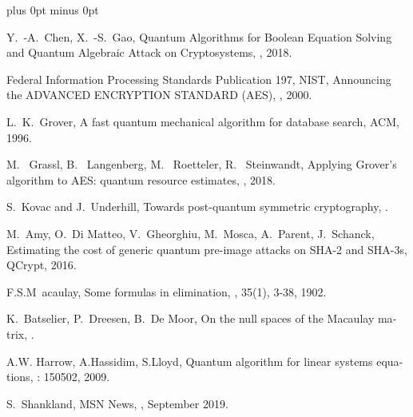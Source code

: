 \documentclass[a4paper,11pt]{article}
\begin{document}
\begin{otherlanguage}{english}

\begin{thebibliography}{1}
\itemsep=0cm plus 0pt minus 0pt

Y.~-A.~Chen, X.~-S.~Gao,
  \newblock Quantum Algorithms for Boolean Equation Solving and Quantum Algebraic Attack on Cryptosystems,
  , 2018.

Federal Information Processing Standards Publication 197, NIST,
  \newblock Announcing the ADVANCED ENCRYPTION STANDARD (AES),
  , 2000.

L.~K.~Grover,
  \newblock A fast quantum mechanical algorithm for database search, 
   ACM, 1996.

M.~ Grassl, B.~ Langenberg, M.~ Roetteler, R.~ Steinwandt,
  \newblock Applying Grover’s algorithm to AES: quantum resource estimates,
  , 2018.

S.~Kovac and J.~Underhill,
  \newblock Towards post-quantum symmetric cryptography,
  .

M.~Amy, O.~Di Matteo, V.~Gheorghiu, M.~Mosca, A.~Parent, J.~Schanck,
  \newblock Estimating the cost of generic quantum pre-image attacks on SHA-2 and SHA-3s, 
   QCrypt, 2016.

F.S.M~acaulay, 
  \newblock Some formulas in elimination, 
  , 35(1), 3-38, 1902. 

K.~Batselier, P.~Dreesen, B.~De Moor, 
  \newblock On the null spaces of the Macaulay matrix, 
  .  

A.W. Harrow, A.Hassidim, S.Lloyd, 
  \newblock Quantum algorithm for linear systems equations, 
  : 150502, 2009. 

  S.~Shankland,
  \newblock MSN News,
  , September 2019.


\end{thebibliography}
\end{otherlanguage}
\end{document}
